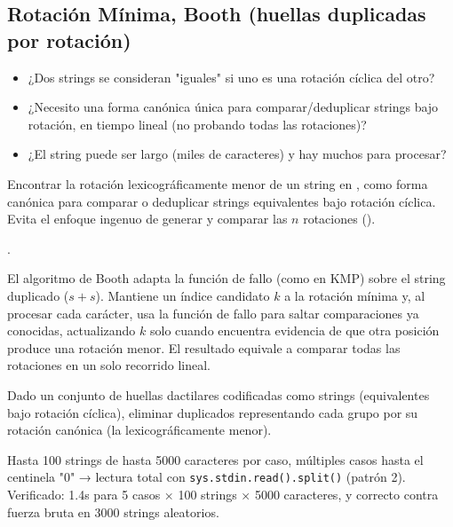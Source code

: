 \subsection{Rotación Mínima, Booth (huellas duplicadas por rotación)}


\begin{itemize}
\item ¿Dos strings se consideran "iguales" si uno es una rotación cíclica del otro?
\item ¿Necesito una forma canónica única para comparar/deduplicar strings bajo rotación, en tiempo lineal (no  probando todas las rotaciones)?
\item ¿El string puede ser largo (miles de caracteres) y hay muchos para procesar?
\end{itemize}

 Encontrar la rotación lexicográficamente menor de un string en , como forma canónica para comparar o deduplicar strings equivalentes bajo rotación cíclica. Evita el enfoque ingenuo de generar y comparar las $n$ rotaciones ().

 .

 El algoritmo de Booth adapta la función de fallo (como en KMP) sobre el string duplicado ($s+s$). Mantiene un índice candidato $k$ a la rotación mínima y, al procesar cada carácter, usa la función de fallo para saltar comparaciones ya conocidas, actualizando $k$ solo cuando encuentra evidencia de que otra posición produce una rotación menor. El resultado equivale a comparar todas las rotaciones en un solo recorrido lineal.


Dado un conjunto de huellas dactilares codificadas como strings (equivalentes bajo rotación cíclica), eliminar duplicados representando cada grupo por su rotación canónica (la lexicográficamente menor).

 Hasta 100 strings de hasta 5000 caracteres por caso, múltiples casos hasta el centinela "0" → lectura total con \texttt{sys.stdin.read().split()} (patrón 2). Verificado: \aprox{}1.4s para 5 casos × 100 strings × 5000 caracteres, y correcto contra fuerza bruta en 3000 strings aleatorios.


